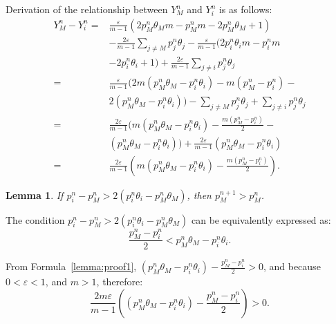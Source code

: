 \documentclass[10pt,journal,cspaper,compsoc,onecolumn]{IEEEtran}
\begin{document}
\begin{spacing}{1.2}
Derivation of the relationship between $Y_M^{n}$ and $Y_i^{n}$ is as follows:
 \begin{align}
    \label{eq:26}
    Y_M^n - Y_i^n = &\displaystyle\frac{\varepsilon}{m - 1}(2p_M^n\theta_Mm - p_M^nm - 2p_M^n\theta_M + 1)\nonumber \\
    & - \displaystyle\frac{2\varepsilon}{m - 1}\sum_{j \neq M}p_j^n\theta_j - \displaystyle\frac{\varepsilon}{m - 1}(2p_i^n\theta_im - p_i^nm\nonumber\\
    & - 2p_i^n\theta_i + 1) + \displaystyle\frac{2\varepsilon}{m - 1}\sum_{j \neq i}p_j^n\theta_j \nonumber\\
    =&\displaystyle\frac{\varepsilon}{m - 1}(2m(p_M^n\theta_M - p_i^n\theta_i) - m(p_M^n - p_i^n) -\nonumber\\
    & 2(p_M^n\theta_M - p_i^n\theta_i)) - \sum_{j \neq M}p_j^n\theta_j + \sum_{j \neq i}p_j^n\theta_j     \nonumber\\
    =& \displaystyle\frac{2\varepsilon}{m - 1}(m(p_M^n\theta_M - p_i^n\theta_i) - \displaystyle\frac{m(p_M^n - p_i^n)}{2} - \nonumber\\
    &(p_M^n\theta_M - p_i^n\theta_i)) + \displaystyle\frac{2\varepsilon}{m-1}(p_M^n\theta_M - p_i^n\theta_i)\nonumber\\
    =&\displaystyle\frac{2\varepsilon}{m - 1}(m(p_M^n\theta_M - p_i^n\theta_i) - \displaystyle\frac{m(p_M^n - p_i^n)}{2}).
\end{align}

\newtheorem{lem_appendix}{Lemma}
\label{Lemma_appdendix}
\begin{lem_appendix}
  If $p_i^{n} - p_M^{n} > 2(p_i^{n}\theta_i - p_M^{n}\theta_M)$, then $p_M^{n + 1} > p_M^{n}$.
\end{lem_appendix}
\begin{IEEEproof}
The condition $p_i^{n} - p_M^{n} > 2(p_i^{n}\theta_i - p_M^{n}\theta_M)$ can be equivalently expressed as:
\begin{equation}
  \label{lemma:proof1}
\displaystyle\frac{p_M^n - p_i^n}{2} < p_M^{n}\theta_M - p_i^{n}\theta_i.
\end{equation}

From Formula~\ref{lemma:proof1},  $(p_M^{n}\theta_M - p_i^{n}\theta_i) - \displaystyle\frac{p_M^n - p_i^n}{2} > 0$, and because $0 < \varepsilon < 1$, and $m > 1$,  therefore:
\begin{equation}
  \label{lemma:proof2}
\displaystyle\frac{2m\varepsilon}{m - 1}((p_M^{n}\theta_M - p_i^{n}\theta_i) - \displaystyle\frac{p_M^n - p_i^n}{2}) > 0.
\end{equation}


\end{IEEEproof}
\end{spacing}
\end{document}
